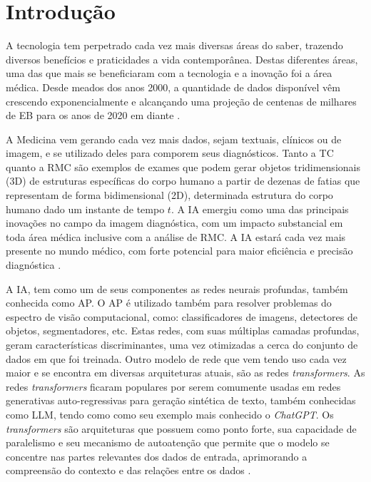\chapter{Introdução}
\label{chap:intro}

A tecnologia tem perpetrado cada vez mais diversas áreas do saber, trazendo diversos benefícios e praticidades a vida contemporânea. Destas diferentes áreas, uma das que mais se beneficiaram com a tecnologia e a inovação foi a área médica. Desde meados dos anos 2000, a quantidade de dados disponível vêm crescendo exponencialmente e alcançando uma projeção de centenas de milhares de \gls{EB} para os anos de 2020 em diante \cite{gantzDIGITALUNIVERSE2020}.

A Medicina vem gerando cada vez mais dados, sejam textuais, clínicos ou de imagem, e se utilizado deles para comporem seus diagnósticos. Tanto a \gls{TC} quanto a \gls{RMC} são exemplos de exames que podem gerar objetos tridimensionais (3D) de estruturas específicas do corpo humano a partir de dezenas de fatias que representam de forma bidimensional (2D), determinada estrutura do corpo humano dado um instante de tempo $t$. A \gls{IA} emergiu como uma das principais inovações no campo da imagem diagnóstica, com um impacto substancial em toda área médica inclusive com a análise de \gls{RMC}. A \gls{IA} estará cada vez mais presente no mundo médico, com forte potencial para maior eficiência e precisão diagnóstica \cite{argentieroApplicationsArtificialIntelligence2022}.

A IA, tem como um de seus componentes as redes neurais profundas, também conhecida como \gls{AP}. O \gls{AP} é utilizado também para resolver problemas do espectro de visão computacional, como: classificadores de imagens, detectores de objetos, segmentadores, etc. Estas redes, com suas múltiplas camadas profundas, geram características discriminantes, uma vez otimizadas a cerca do conjunto de dados em que foi treinada. Outro modelo de rede que vem tendo uso cada vez maior e se encontra em diversas arquiteturas atuais, são as redes \textit{transformers}. As redes \textit{transformers} ficaram populares por serem comumente usadas em redes generativas auto-regressivas para geração sintética de texto, também conhecidas como \gls{LLM}, tendo como como seu exemplo mais conhecido o \textit{ChatGPT}. Os \textit{transformers} são arquiteturas que possuem como ponto forte, sua capacidade de paralelismo e seu mecanismo de autoatenção que permite que o modelo se concentre nas partes relevantes dos dados de entrada, aprimorando a compreensão do contexto e das relações entre os dados \cite{russell2020artificial}.


